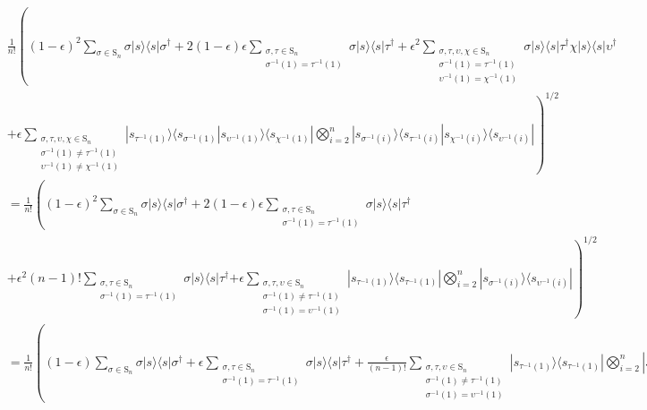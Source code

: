 \begin{align}
&\frac{1}{n!} \left((1-\epsilon)^2\sum_{\sigma\in \textrm{S}_n}\sigma|s\rangle\langle s|\sigma^\dagger + 2(1-\epsilon)\epsilon\sum_{\substack{\sigma,\tau \in \textrm{S}_n\\\sigma^{-1}(1) = \tau^{-1}(1)}}\sigma|s\rangle\langle s|\tau^\dagger+ \epsilon^2\sum_{\substack{\sigma,\tau,\upsilon,\chi \in \textrm{S}_n\\\sigma^{-1}(1) = \tau^{-1}(1)\\\upsilon^{-1}(1) = \chi^{-1}(1)}}\sigma|s\rangle\langle s|\tau^\dagger\chi|s\rangle\langle s|\upsilon^\dagger\right.\\
&\left. + \epsilon\sum_{\substack{\sigma,\tau,\upsilon,\chi \in \textrm{S}_n\\\sigma^{-1}(1) \neq \tau^{-1}(1)\\\upsilon^{-1}(1) \neq \chi^{-1}(1)}}|s_{\tau^{-1}(1)}\rangle\langle s_{\sigma^{-1}(1)}|s_{\upsilon^{-1}(1)}\rangle\langle s_{\chi^{-1}(1)}|\bigotimes_{i=2}^n|s_{\sigma^{-1}(i)}\rangle\langle s_{\tau^{-1}(i)}|s_{\chi^{-1}(i)}\rangle\langle s_{\upsilon^{-1}(i)}|\right)^{1/2}\\
&= \frac{1}{n!}\left((1-\epsilon)^2\sum_{\sigma\in \textrm{S}_n}\sigma|s\rangle\langle s|\sigma^\dagger + 2(1-\epsilon)\epsilon\sum_{\substack{\sigma,\tau \in \textrm{S}_n\\\sigma^{-1}(1) = \tau^{-1}(1)}}\sigma|s\rangle\langle s|\tau^\dagger\right.\\
&\left.+ \epsilon^2(n-1)!\sum_{\substack{\sigma,\tau \in \textrm{S}_n\\\sigma^{-1}(1) = \tau^{-1}(1)}}\sigma|s\rangle\langle s|\tau^\dagger\right.
\left. + \epsilon\sum_{\substack{\sigma,\tau,\upsilon \in \textrm{S}_n\\\sigma^{-1}(1) \neq \tau^{-1}(1)\\\sigma^{-1}(1) = \upsilon^{-1}(1)}}|s_{\tau^{-1}(1)}\rangle\langle s_{\tau^{-1}(1)}|\bigotimes_{i=2}^n|s_{\sigma^{-1}(i)}\rangle\langle s_{\upsilon^{-1}(i)}|\right)^{1/2} \\
&= \frac{1}{n!}\left((1-\epsilon)\sum_{\sigma\in \textrm{S}_n}\sigma|s\rangle\langle s|\sigma^\dagger + \epsilon\sum_{\substack{\sigma,\tau \in \textrm{S}_n\\\sigma^{-1}(1) = \tau^{-1}(1)}}\sigma|s\rangle\langle s|\tau^\dagger + \frac{\epsilon}{(n-1)!}\sum_{\substack{\sigma,\tau,\upsilon \in \textrm{S}_n\\\sigma^{-1}(1) \neq \tau^{-1}(1)\\\sigma^{-1}(1) = \upsilon^{-1}(1)}}|s_{\tau^{-1}(1)}\rangle\langle s_{\tau^{-1}(1)}|\bigotimes_{i=2}^n|s_{\sigma^{-1}(i)}\rangle\langle s_{\upsilon^{-1}(i)}|\right).\label{eqn:mismatched-perms}
\end{align}

